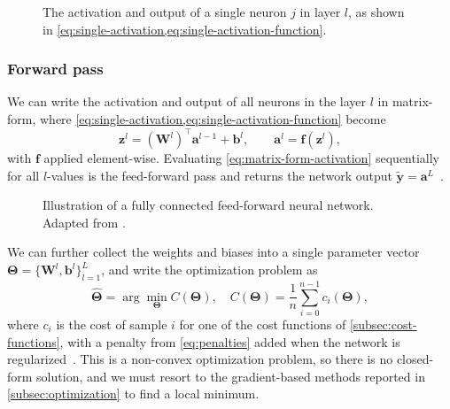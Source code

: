 \begin{figure}[htbp]
    \centering
    
    \caption{The activation and output of a single neuron $j$ in layer $l$,
    as shown in \cref{eq:single-activation,eq:single-activation-function}.}
    \label{fig:single-artificial-neuron}
\end{figure}

\subsubsection{Forward pass}

We can write the activation and output of all neurons in the layer $l$ in matrix-form,
where \cref{eq:single-activation,eq:single-activation-function} become
\begin{equation}\label{eq:matrix-form-activation}
    \bm{z}^l = (\bm{W}^l)^\top \bm{a}^{l-1} + \bm{b}^l,
    \qquad \bm{a}^l = \bm{f}(\bm{z}^l),
\end{equation}
with $\bm{f}$ applied element-wise. Evaluating \cref{eq:matrix-form-activation}
sequentially for all $l$-values is the feed-forward pass and returns the network
output $\bm{\tilde{y}}=\bm{a}^L$~\cite{hjorth-jensen_2026}.

\begin{figure}[htbp]
    \centering
    
    \caption{Illustration of a fully connected feed-forward neural network.
    Adapted from \textcite{love_2024}.}
    \label{fig:neural-network-tikz}
\end{figure}

We can further collect the weights and biases into a single parameter vector
$\bm{\Theta}=\{\bm{W}^l, \bm{b}^l\}_{l=1}^L$, and write the optimization problem as
\begin{equation}\label{eq:nn-optimization-problem}
    \hat{\bm{\Theta}} = \arg \min_{\bm{\Theta}} C(\bm{\Theta}), \quad
    C(\bm{\Theta}) = \frac{1}{n} \sum_{i=0}^{n-1} c_i(\bm{\Theta}),
\end{equation}
where $c_i$ is the cost of sample $i$ for one of the cost functions of
\cref{subsec:cost-functions}, with a penalty from \cref{eq:penalties} added when the network
is regularized~\cite{hjorth-jensen_2026}.
This is a non-convex optimization problem, so there is no closed-form solution, and we must
resort to the gradient-based methods reported in \cref{subsec:optimization} to find
a local minimum.


